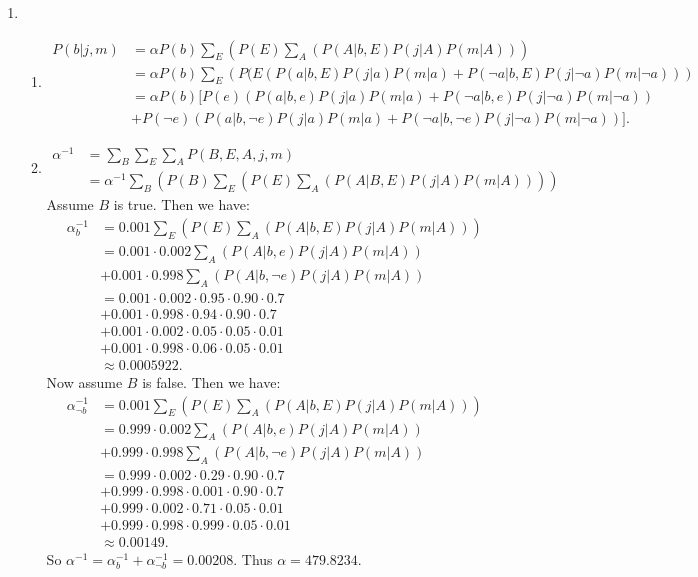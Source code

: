 \documentclass[12pt,oneside,reqno]{amsart}
\theoremstyle{plain}
\theoremstyle{definition}
\theoremstyle{remark}
\newcommand{\bee}{\begin{equation}\begin{aligned}}
\newcommand{\eee}{\end{aligned}\end{equation}}
\begin{document}
\begin{enumerate}[label=\arabic*.]
\begin{enumerate}
\end{enumerate}
\item 
\begin{enumerate}
\item 
\bee
P(b|j,m) &= \alpha P(b)\sum_E\left( P(E) \sum_A \left(P(A|b,E)P(j|A)P(m|A)\right) \right)\\
&= \alpha P(b)\sum_E\left( P(E \left(P(a|b,E)P(j|a)P(m|a) +P(\neg a|b,E)P(j|\neg a)P(m|\neg a) \right) \right)\\
&= \alpha P(b) [P(e) \left(P(a|b,e)P(j|a)P(m|a) +P(\neg a|b,e)P(j|\neg a)P(m|\neg a) \right)\\
&+ P(\neg e) \left(P(a|b,\neg e)P(j|a)P(m|a) +P(\neg a|b,\neg e)P(j|\neg a)P(m|\neg a) \right)].
\eee


\item 
\bee
\alpha^{-1} &= \sum_B\sum_E\sum_A P(B,E,A,j,m)\\
&= \alpha^{-1} \sum_B \left( P(B)\sum_E\left( P(E) \sum_A \left( P(A|B,E)P(j|A)P(m|A)\right) \right)\right)
\eee
Assume $B$ is true. Then we have:
\bee
\alpha^{-1}_b &=0.001 \sum_E\left( P(E) \sum_A \left( P(A|b,E)P(j|A)P(m|A)\right) \right)\\
&=0.001 \cdot 0.002 \sum_A \left( P(A|b,e)P(j|A)P(m|A)\right) \\
&+ 0.001 \cdot 0.998 \sum_A \left( P(A|b,\neg e)P(j|A)P(m|A)\right) \\
&=  0.001 \cdot 0.002 \cdot 0.95\cdot 0.90 \cdot 0.7\\
&+ 0.001 \cdot 0.998 \cdot 0.94\cdot 0.90 \cdot 0.7\\
&+  0.001 \cdot 0.002  \cdot 0.05 \cdot 0.05 \cdot 0.01  \\
&+ 0.001 \cdot 0.998  \cdot 0.06 \cdot 0.05 \cdot 0.01 \\
&\approx 0.0005922.
\eee
Now assume $B$ is false. Then we have: 
\bee
\alpha^{-1}_{\neg b} &=0.001 \sum_E\left( P(E) \sum_A \left( P(A|b,E)P(j|A)P(m|A)\right) \right)\\
&=0.999 \cdot 0.002 \sum_A \left( P(A|b,e)P(j|A)P(m|A)\right) \\
&+ 0.999 \cdot 0.998 \sum_A \left( P(A|b,\neg e)P(j|A)P(m|A)\right) \\
&=  0.999 \cdot 0.002 \cdot 0.29\cdot 0.90 \cdot 0.7\\
&+ 0.999 \cdot 0.998 \cdot 0.001\cdot 0.90 \cdot 0.7\\
&+  0.999 \cdot 0.002  \cdot 0.71 \cdot 0.05 \cdot 0.01  \\
&+ 0.999 \cdot 0.998  \cdot 0.999 \cdot 0.05 \cdot 0.01 \\
&\approx 0.00149.
\eee
So $\alpha^{-1} = \alpha^{-1}_b + \alpha^{-1}_{\neg b} = 0.00208$. Thus $\alpha = 479.8234$. 



\end{enumerate}
\end{enumerate}
\end{document}
